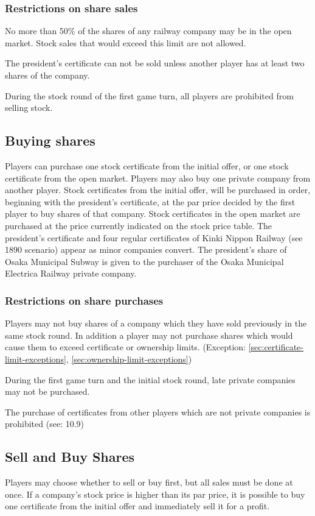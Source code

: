 \documentclass{article}
\begin{document}
\begin{CJK}{UTF8}{min}
\subsubsection{Restrictions on share sales}
No more than 50\% of the shares of any railway company may be in the
open market. Stock sales that would exceed this limit are not
allowed.

The president's certificate can not be sold unless another player
has at least two shares of the company.

During the stock round of the first game turn, all players are
prohibited from selling stock.

\subsection{Buying shares}
Players can purchase one stock certificate from the initial offer, or
one stock certificate from the open market. Players may also buy one
private company from another player.  Stock certificates from the
initial offer, will be purchased in order, beginning with the
president's certificate, at the par price decided by the first player
to buy shares of that company. Stock certificates in the open market
are purchased at the price currently indicated on the stock price
table. The president's certificate and four regular certificates of
Kinki Nippon Railway (see 1890 scenario) appear as minor companies
convert. The president's share of Osaka Municipal Subway is given to the
purchaser of the Osaka Municipal Electrica Railway private company.

\subsubsection{Restrictions on share purchases}
Players may not buy shares of a company which they have sold
previously in the same stock round. In addition a player may not
purchase shares which would cause them to exceed certificate or
ownership limits. (Exception: \ref{sec:certificate-limit-exceptions},
\ref{sec:ownership-limit-exceptions})

During the first game turn and the initial stock round, late private
companies may not be purchased.

The purchase of certificates from other players which are not private
companies is prohibited (see: 10.9)

\subsection{Sell and Buy Shares}
Players may choose whether to sell or buy first, but all sales must be
done at once. If a company's stock price is higher than its par price,
it is possible to buy one certificate from the initial offer and
immediately sell it for a profit.


\end{CJK}
\end{document}
